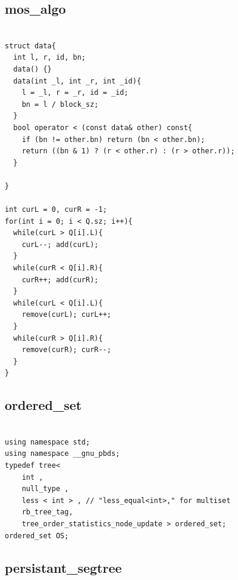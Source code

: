 \documentclass[9pt, landscape, a4paper,twosided]{extarticle}
\begin{document}
\begin{multicols*}{3}
\subsection{mos\_algo}
\begin{verbatim}

struct data{
  int l, r, id, bn;
  data() {}
  data(int _l, int _r, int _id){
    l = _l, r = _r, id = _id;
    bn = l / block_sz;
  }
  bool operator < (const data& other) const{
    if (bn != other.bn) return (bn < other.bn);
    return ((bn & 1) ? (r < other.r) : (r > other.r));
  }

}

int curL = 0, curR = -1;
for(int i = 0; i < Q.sz; i++){
  while(curL > Q[i].L){
    curL--; add(curL);
  }
  while(curR < Q[i].R){
    curR++; add(curR);
  }
  while(curL < Q[i].L){
    remove(curL); curL++;
  }
  while(curR > Q[i].R){
    remove(curR); curR--;
  }
}
\end{verbatim}

\subsection{ordered\_set}
\begin{verbatim}

using namespace std;
using namespace __gnu_pbds;
typedef tree<
    int ,
    null_type ,
    less < int > , // "less_equal<int>," for multiset
    rb_tree_tag,
    tree_order_statistics_node_update > ordered_set;
ordered_set OS;
\end{verbatim}

\subsection{persistant\_segtree}
\begin{verbatim}


\end{verbatim}
\end{multicols*}
\end{document}
